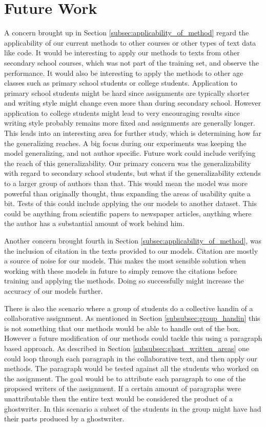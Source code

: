\section{Future Work} \label{sec:future_work}

A concern brought up in Section \ref{subsec:applicability_of_method} regard the
applicability of our current methods to other courses or other types of text
data like code. It would be interesting to apply our methods to texts from other
secondary school courses, which was not part of the training set, and observe
the performance. It would also be interesting to apply the methods to other age
classes such as primary school students or college students. Application to
primary school students might be hard since assignments are typically shorter
and writing style might change even more than during secondary school. However
application to college students might lead to very encouraging results since
writing style probably remains more fixed and assignments are generally longer.
This leads into an interesting area for further study, which is determining how
far the generalizing reaches. A big focus during our experiments was keeping the
model generalizing, and not author specific. Future work could include verifying
the reach of this generalizability. Our primary concern was the generalizability
with regard to secondary school students, but what if the generalizability
extends to a larger group of authors than that. This would mean the model was
more powerful than originally thought, thus expanding the areas of usability
quite a bit. Tests of this could include applying the our models to another
dataset. This could be anything from scientific papers to newspaper articles,
anything where the author has a substantial amount of work behind him.

Another concern brought fourth in Section \ref{subsec:applicability_of_method},
was the inclusion of citation in the texts provided to our models. Citation are
mostly a source of noise for our models. This makes the most sensible solution
when working with these models in future to simply remove the citations before
training and applying the methods. Doing so successfully might increase the
accuracy of our models further.

There is also the scenario where a group of students do a collective handin of a
collaborative assignment. As mentioned in Section \ref{subsubsec:group_handin}
this is not something that our methods would be able to handle out of the box.
However a future modification of our methods could tackle this using a paragraph
based approach. As described in Section \ref{subsubsec:ghost_written_areas}
one could loop through each paragraph in the collaborative text, and then
apply our methods. The paragraph would be tested against all the students who
worked on the assignment. The goal would be to attribute each paragraph to one
of the proposed writers of the assignment. If a certain amount of paragraphs
were unattributable then the entire text would be considered the product of a
ghostwriter. In this scenario a subset of the students in the group might have
had their parts produced by a ghostwriter.

